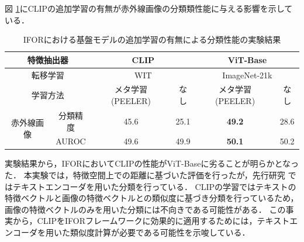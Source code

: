 \documentclass[a4paper,11pt,nomag]{jsreport}
\begin{document}
図 \ref{tbl:exp3}にCLIPの追加学習の有無が赤外線画像の分類類性能に与える影響を示している．
\begin{table}[tbp]
  \centering
  \caption{IFORにおける基盤モデルの追加学習の有無による分類性能の実験結果}
  \label{tbl:exp3}

  \begin{tabular}{cc||c|c|c|c}
      \hline
      \multicolumn{2}{c||}{特徴抽出器}      & \multicolumn{2}{c|}{CLIP} & \multicolumn{2}{c}{ViT-Base} \\ \hline
      \multicolumn{2}{c||}{転移学習}       &  \multicolumn{2}{c|}{WIT}  & \multicolumn{2}{c}{ImageNet-21k} \\ \hline
      \multicolumn{2}{c||}{学習方法}       & メタ学習 (PEELER) &   なし   & メタ学習 (PEELER) &    なし    \\ \hline\hline
      \multirow{2}{*}{赤外線画像} & 分類精度 &       45.6      &   25.1   &  \textbf{49.2}  &    28.6    \\
                                & AUROC   &       49.6      &   49.9   &  \textbf{50.1}  &    50.2    \\ \hline
  \end{tabular}
\end{table}
% 
実験結果から，IFORにおいてCLIPの性能がViT-Baseに劣ることが明らかとなった．
本実験では，特徴空間上での距離に基づいた評価を行ったが，先行研究 \cite{clip}ではテキストエンコーダを用いた分類を行っている．
CLIPの学習ではテキストの特徴ベクトルと画像の特徴ベクトルとの類似度に基づき分類を行っているため，画像の特徴ベクトルのみを用いた分類には不向きである可能性がある．
この事実から，CLIPをIFORフレームワークに効果的に適用するためには，テキストエンコーダを用いた類似度計算が必要である可能性を示唆している．

\end{document}

